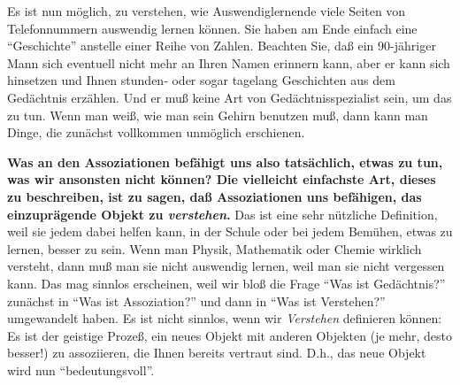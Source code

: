 Es ist nun möglich, zu verstehen, wie Auswendiglernende viele Seiten von Telefonnummern auswendig lernen können.
Sie haben am Ende einfach eine \enquote{Geschichte} anstelle einer Reihe von Zahlen.
Beachten Sie, daß ein 90-jähriger Mann sich eventuell nicht mehr an Ihren Namen erinnern kann, aber er kann sich hinsetzen und Ihnen stunden- oder sogar tagelang Geschichten aus dem Gedächtnis erzählen.
Und er muß keine Art von Gedächtnisspezialist sein, um das zu tun.
Wenn man weiß, wie man sein Gehirn benutzen muß, dann kann man Dinge, die zunächst vollkommen unmöglich erschienen.

\textbf{Was an den Assoziationen befähigt uns also tatsächlich, etwas zu tun, was wir ansonsten nicht können?
Die vielleicht einfachste Art, dieses zu beschreiben, ist zu sagen, daß Assoziationen uns befähigen, das einzuprägende Objekt zu \textit{verstehen}.}
Das ist eine sehr nützliche Definition, weil sie jedem dabei helfen kann, in der Schule oder bei jedem Bemühen, etwas zu lernen, besser zu sein.
Wenn man Physik, Mathematik oder Chemie wirklich versteht, dann muß man sie nicht auswendig lernen, weil man sie nicht vergessen kann.
Das mag sinnlos erscheinen, weil wir bloß die Frage \enquote{Was ist Gedächtnis?} zunächst in \enquote{Was ist Assoziation?} und dann in \enquote{Was ist Verstehen?} umgewandelt haben.
Es ist nicht sinnlos, wenn wir \textit{Verstehen} definieren können: Es ist der geistige Prozeß, ein neues Objekt mit anderen Objekten (je mehr, desto besser!) zu assoziieren, die Ihnen bereits vertraut sind.
D.h., das neue Objekt wird nun \enquote{bedeutungsvoll}.

